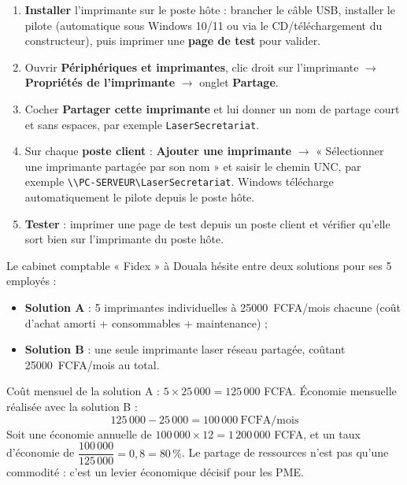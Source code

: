 \documentclass[11pt]{article}
\begin{document}
\begin{methode}
\begin{enumerate}
  \item \textbf{Installer} l'imprimante sur le poste hôte : brancher le câble USB, installer le pilote (automatique sous Windows 10/11 ou via le CD/téléchargement du constructeur), puis imprimer une \textbf{page de test} pour valider.
  \item Ouvrir \textbf{Périphériques et imprimantes}, clic droit sur l'imprimante $\rightarrow$ \textbf{Propriétés de l'imprimante} $\rightarrow$ onglet \textbf{Partage}.
  \item Cocher \textbf{Partager cette imprimante} et lui donner un nom de partage court et sans espaces, par exemple \texttt{LaserSecretariat}.
  \item Sur chaque \textbf{poste client} : \textbf{Ajouter une imprimante} $\rightarrow$ « Sélectionner une imprimante partagée par son nom » et saisir le chemin UNC, par exemple \texttt{\textbackslash\textbackslash PC-SERVEUR\textbackslash LaserSecretariat}. Windows télécharge automatiquement le pilote depuis le poste hôte.
  \item \textbf{Tester} : imprimer une page de test depuis un poste client et vérifier qu'elle sort bien sur l'imprimante du poste hôte.
\end{enumerate}
\end{methode}

\begin{exemplebox}
Le cabinet comptable « Fidex » à Douala hésite entre deux solutions pour ses 5 employés :
\begin{itemize}
  \item \textbf{Solution A} : 5 imprimantes individuelles à \SI{25000}{FCFA}/mois chacune (coût d'achat amorti + consommables + maintenance) ;
  \item \textbf{Solution B} : une seule imprimante laser réseau partagée, coûtant \SI{25000}{FCFA}/mois au total.
\end{itemize}
Coût mensuel de la solution A : $5 \times 25\,000 = 125\,000$ FCFA. Économie mensuelle réalisée avec la solution B :
\[
125\,000 - 25\,000 = 100\,000\ \text{FCFA/mois}
\]
Soit une économie annuelle de $100\,000 \times 12 = 1\,200\,000$ FCFA, et un taux d'économie de $\dfrac{100\,000}{125\,000} = 0{,}8 = 80\,\%$. Le partage de ressources n'est pas qu'une commodité : c'est un levier économique décisif pour les PME.
\end{exemplebox}
\end{document}

